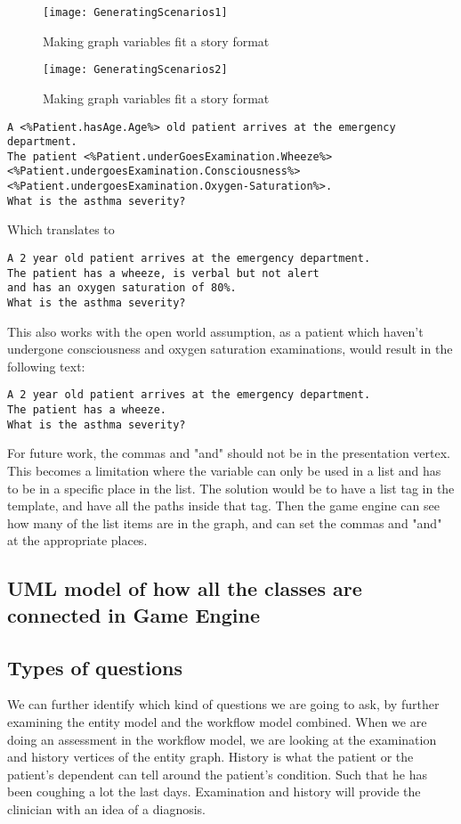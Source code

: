 \begin{figure}[h!]
	\caption {Making graph variables fit a story format}
	\label{fig:GeneratingScenarios1}
	\texttt{[image: GeneratingScenarios1]}
\end{figure}

\begin{figure}[h!]
	\caption {Making graph variables fit a story format}
	\label{fig:GeneratingScenarios2}
	\texttt{[image: GeneratingScenarios2]}
\end{figure}

\begin{verbatim}
A <%Patient.hasAge.Age%> old patient arrives at the emergency department. 
The patient <%Patient.underGoesExamination.Wheeze%> 
<%Patient.undergoesExamination.Consciousness%> 
<%Patient.undergoesExamination.Oxygen-Saturation%>. 
What is the asthma severity? 
\end{verbatim}

Which translates to 
\begin{verbatim}
A 2 year old patient arrives at the emergency department. 
The patient has a wheeze, is verbal but not alert 
and has an oxygen saturation of 80%. 
What is the asthma severity? 
\end{verbatim}

This also works with the open world assumption, as a patient which haven't undergone consciousness and oxygen saturation examinations, would result in the following text:

\begin{verbatim}
A 2 year old patient arrives at the emergency department. 
The patient has a wheeze. 
What is the asthma severity? 
\end{verbatim}

For future work, the commas and "and" should not be in the presentation vertex. This becomes a limitation where the variable can only be used in a list and has to be in a specific place in the list. The solution would be to have a list tag in the template, and have all the paths inside that tag. Then the game engine can see how many of the list items are in the graph, and can set the commas and "and" at the appropriate places.

\subsection{UML model of how all the classes are connected in Game Engine}

\subsection{Types of questions}
We can further identify which kind of questions we are going to ask, by further examining the entity model and the workflow model combined. When we are doing an assessment in the workflow model, we are looking at the examination and history vertices of the entity graph. History is what the patient or the patient's dependent can tell around the patient's condition. Such that he has been coughing a lot the last days. Examination and history will provide the clinician with an idea of a diagnosis.

